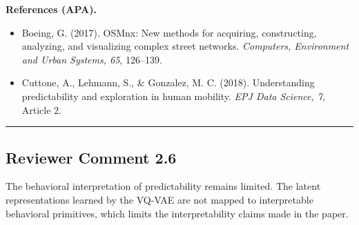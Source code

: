 \documentclass{NSF}
\begin{document}
\vskip 0.05in
\noindent\textbf{References (APA).}
\begin{itemize}
    \item Boeing, G. (2017). OSMnx: New methods for acquiring, constructing, analyzing, and visualizing complex street networks. \textit{Computers, Environment and Urban Systems, 65}, 126--139.
    \item Cuttone, A., Lehmann, S., \& Gonzalez, M. C. (2018). Understanding predictability and exploration in human mobility. \textit{EPJ Data Science, 7}, Article 2.
\end{itemize}

\noindent\rule{16.5cm}{1.0pt}

\subsection{Reviewer Comment 2.6}
\begin{mdframed}
The behavioral interpretation of predictability remains limited. The latent representations learned by the VQ-VAE are not mapped to interpretable behavioral primitives, which limits the interpretability claims made in the paper.
\end{mdframed}
\end{document}

